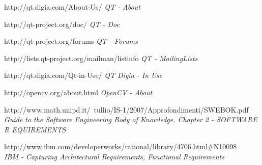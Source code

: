 \documentclass[a4paper,12pt,oneside]{report}
\begin{document}
\begin{thebibliography}{99}
		http://qt.digia.com/About-Us/
        {\em QT - About } 
 
        http://qt-project.org/doc/
        {\em QT - Doc} 
         
        http://qt-project.org/forums
        {\em QT - Forums}        

          http://lists.qt-project.org/mailman/listinfo 
        {\em QT - MailingLists}        


        http://qt.digia.com/Qt-in-Use/
        {\em QT Digia - In Use}  
        
        
        http://opencv.org/about.html
        {\em OpenCV - About}  
        
        
        http://www.math.unipd.it/~tullio/IS-1/2007/Approfondimenti/SWEBOK.pdf\\
        {\em Guide to the Software Engineering Body of Knowledge, Chapter 2 - SOFTWARE R EQUIREMENTS}
        
        
		http://www.ibm.com/developerworks/rational/library/4706.html\#N10098 \\
        {\em IBM - Capturing Architectural Requirements, Functional Requirements }
        

        



\end{thebibliography}
\end{document}
